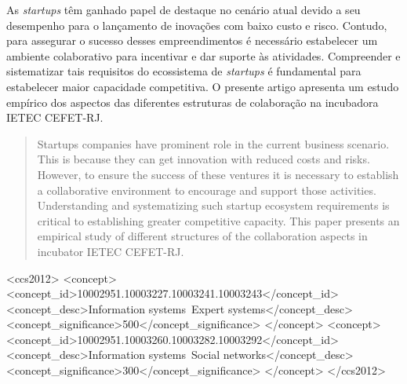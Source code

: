 \documentclass{sig-alternate-05-2015}
\begin{document}
\date{30 July 1999}

\maketitle

\begin{resumo}
As \textit{startups} têm ganhado papel de destaque no cenário atual devido a seu desempenho para o lançamento de inovações com baixo custo e risco. Contudo, para assegurar o sucesso desses empreendimentos é necessário estabelecer um ambiente colaborativo para incentivar e dar suporte às atividades. Compreender e sistematizar tais requisitos do ecossistema de \textit{startups} é fundamental para estabelecer maior capacidade competitiva. O presente artigo apresenta um estudo empírico dos aspectos das diferentes estruturas de colaboração na incubadora IETEC CEFET-RJ. 
\end{resumo}


\begin{abstract}
Startups companies have prominent role in the current business scenario. This is because they can get innovation with reduced costs and risks. However, to ensure the success of these ventures it is necessary to establish a collaborative environment to encourage and support those activities. Understanding and systematizing such startup ecosystem requirements is critical to establishing greater competitive capacity. This paper presents an empirical study of different structures of the collaboration aspects in incubator IETEC CEFET-RJ.
\end{abstract}


%
%
\begin{CCSXML}
<ccs2012>
	<concept>
		<concept_id>10002951.10003227.10003241.10003243</concept_id>
		<concept_desc>Information systems~Expert systems</concept_desc>
		<concept_significance>500</concept_significance>
	</concept>
	<concept>
		<concept_id>10002951.10003260.10003282.10003292</concept_id>
		<concept_desc>Information systems~Social networks</concept_desc>
		<concept_significance>300</concept_significance>
	</concept>
</ccs2012>  
\end{CCSXML}
\end{document}
